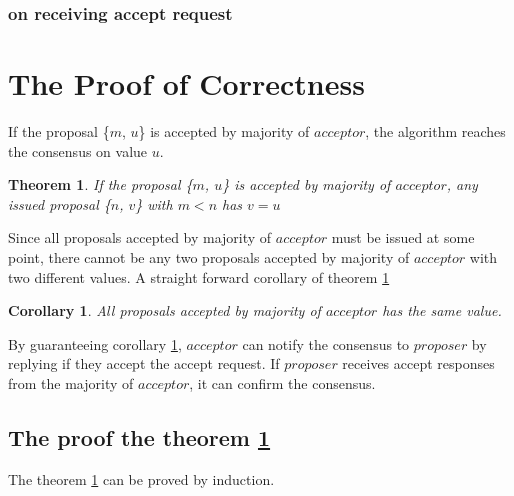 \documentclass{article}
\newtheorem{theorem}{Theorem}
\newtheorem{corollary}{Corollary}
\begin{document}
    \subsubsection{on receiving accept request}
    \label{algorithm:acceptor:accept}
    


\section{The Proof of Correctness}

    If the proposal \{$m$, $u$\} is accepted by majority of $acceptor$, the algorithm reaches the consensus on value $u$.
    
    \begin{theorem}
    \label{theorem:1}
    If the proposal \{$m$, $u$\} is accepted by majority of $acceptor$, any issued proposal \{$n$, $v$\} with $m < n$ has $v = u$
    \end{theorem}
    
    Since all proposals accepted by majority of $acceptor$ must be issued at some point, there cannot be any two proposals accepted by majority of $acceptor$ with two different values. A straight forward corollary of theorem \ref{theorem:1}
    
    \begin{corollary}
    \label{corollary:1}
    All proposals accepted by majority of $acceptor$ has the same value.
    \end{corollary}
    
    By guaranteeing corollary \ref{corollary:1}, $acceptor$ can notify the consensus to $proposer$ by replying if they accept the accept request. If $proposer$ receives accept responses from the majority of $acceptor$, it can confirm the consensus.
    
    \subsection{The proof the theorem \ref{theorem:1}}
    
    The theorem \ref{theorem:1} can be proved by induction.
    
\end{document}
